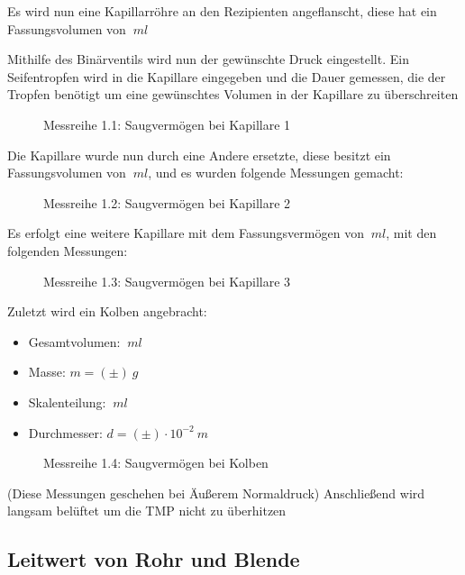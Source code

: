 \documentclass[12pt, a4paper]{scrartcl}
\begin{document}
    	Es wird nun eine Kapillarröhre an den Rezipienten angeflanscht, diese hat ein Fassungsvolumen von $\ ml$
    
    	Mithilfe des Binärventils wird nun der gewünschte Druck eingestellt. Ein Seifentropfen wird in die Kapillare eingegeben und die Dauer gemessen, die der Tropfen benötigt um eine gewünschtes Volumen in der Kapillare zu überschreiten
    	
    	\begin{figure}[H]
    		\centering
    		\caption{Messreihe 1.1: Saugvermögen bei Kapillare 1}
    		
    	\end{figure}
    	
    	Die Kapillare wurde nun durch eine Andere ersetzte, diese besitzt ein Fassungsvolumen von $\ ml$, und es wurden folgende Messungen gemacht:
    	
 	    \begin{figure}[H]
    		\centering
    		\caption{Messreihe 1.2: Saugvermögen bei Kapillare 2}
    	\end{figure}
    	
    	Es erfolgt eine weitere Kapillare mit dem Fassungsvermögen von $\ ml$, mit den folgenden Messungen:
    	
    	\begin{figure}[H]
			\centering
			\caption{Messreihe 1.3: Saugvermögen bei Kapillare 3}
		\end{figure}
    	
    	Zuletzt wird ein Kolben angebracht:
    	
    	\begin{itemize}
    		\item Gesamtvolumen: $\ ml$
    		\item Masse: $m=(\pm)\ g$
    		\item Skalenteilung: $\ ml$
    		\item Durchmesser: $d=(\pm)\cdot10^{-2}\ m$
    	\end{itemize}
    
    	\begin{figure}[H]
			\centering
			\caption{Messreihe 1.4: Saugvermögen bei Kolben}
		\end{figure}
    	
    	(Diese Messungen geschehen bei Äußerem Normaldruck)
    	Anschließend wird langsam belüftet um die TMP nicht zu überhitzen
    	
    
    \subsection{Leitwert von Rohr und Blende}
    
\end{document}
